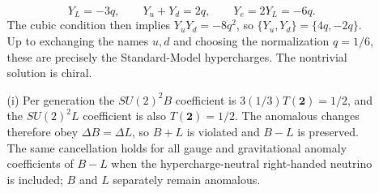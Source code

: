 \begin{enumerate}
\begin{enumerate}
      \[
        Y_L=-3q,\qquad Y_u+Y_d=2q,\qquad Y_e=2Y_L=-6q.
      \]
      The cubic condition then implies
      \(Y_uY_d=-8q^2\), so
      \(\{Y_u,Y_d\}=\{4q,-2q\}\).  Up to exchanging the names \(u,d\)
      and choosing the normalization \(q=1/6\), these are precisely the
      Standard-Model hypercharges.  The nontrivial solution is chiral.
    \item[(i)] Per generation the \(SU(2)^2B\) coefficient is
      \(3(1/3)T(\mathbf2)=1/2\), and the \(SU(2)^2L\) coefficient is also
      \(T(\mathbf2)=1/2\).  The anomalous changes therefore obey
      \(\Delta B=\Delta L\), so \(B+L\) is violated and \(B-L\) is
      preserved.  The same cancellation holds for all gauge and
      gravitational anomaly coefficients of \(B-L\) when the
      hypercharge-neutral right-handed neutrino is included; \(B\) and
      \(L\) separately remain anomalous.
  \end{enumerate}


\end{enumerate}
